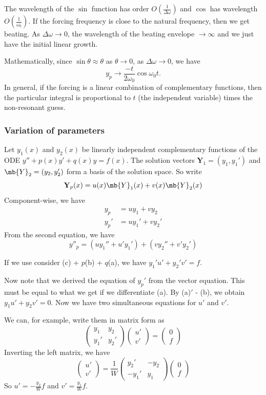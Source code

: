 \documentclass[a4paper]{article}
\begin{document}
  The wavelength of the $\sin$ function has order $O(\frac{1}{\Delta \omega})$ and $\cos$ has wavelength $O(\frac{1}{\omega_0})$. If the forcing frequency is close to the natural frequency, then we get beating. As $\Delta\omega\to 0$, the wavelength of the beating envelope $\to \infty$ and we just have the initial linear growth.

  Mathematically, since $\sin\theta \approx \theta$ as $\theta \to 0$, as $\Delta\omega \to 0$, we have
  \[
    y_p\to \frac{-t}{2\omega_0}\cos\omega_0 t.
  \]
  In general, if the forcing is a linear combination of complementary functions, then the particular integral is proportional to $t$ (the independent variable) times the non-resonant guess.

  \subsubsection{Variation of parameters}
  Let $y_1(x)$ and $y_2(x)$ be linearly independent complementary functions of the ODE $y'' + p(x)y' + q(x)y = f(x)$. The solution vectors $\mathbf{Y}_1 = (y_1, y_1')$ and $\mb{Y}_2 = (y_2, y_2')$ form a basis of the solution space. So write
  \[
    \mathbf{Y}_p(x) = u(x)\mb{Y}_1(x) + v(x)\mb{Y}_2(x)
  \]
  Component-wise, we have 
  \begin{align*}
    y_p &= uy_1 + vy_2 \tag{a}\\
    y_p' &= uy_1' + vy_2' \tag{b}
  \end{align*}
  From the second equation, we have
  \[
    y''_p  = (uy_1'' + u'y_1') + (vy_2'' + v'y_2') \tag{c}
  \]

  If we use consider (c) + $p$(b) + $q$(a), we have $y_1' u' + y_2'v' = f$.

  Now note that we derived the equation of $y_p'$ from the vector equation. This must be equal to what we get if we differentiate (a). By (a)$'$ - (b), we obtain $y_1u' + y_2v' = 0$. Now we have two simultaneous equations for $u'$ and $v'$.

  We can, for example, write them in matrix form as
  \[
    \begin{pmatrix}
      y_1 & y_2\\
      y_1' & y_2'
    \end{pmatrix}
    \begin{pmatrix}
      u'\\
      v'
    \end{pmatrix}
    =
    \begin{pmatrix}
      0\\
      f
    \end{pmatrix}
  \]
  Inverting the left matrix, we have
  \[
    \begin{pmatrix}
      u'\\
      v'
    \end{pmatrix} = \frac{1}{W}
    \begin{pmatrix}
      y_2' & -y_2\\
      -y_1' & y_1
    \end{pmatrix}
    \begin{pmatrix}
      0\\f
    \end{pmatrix}
  \]
  So $u' = -\frac{y_2}{W}f$ and $v' = \frac{y_1}{W}f$.
\end{document}
